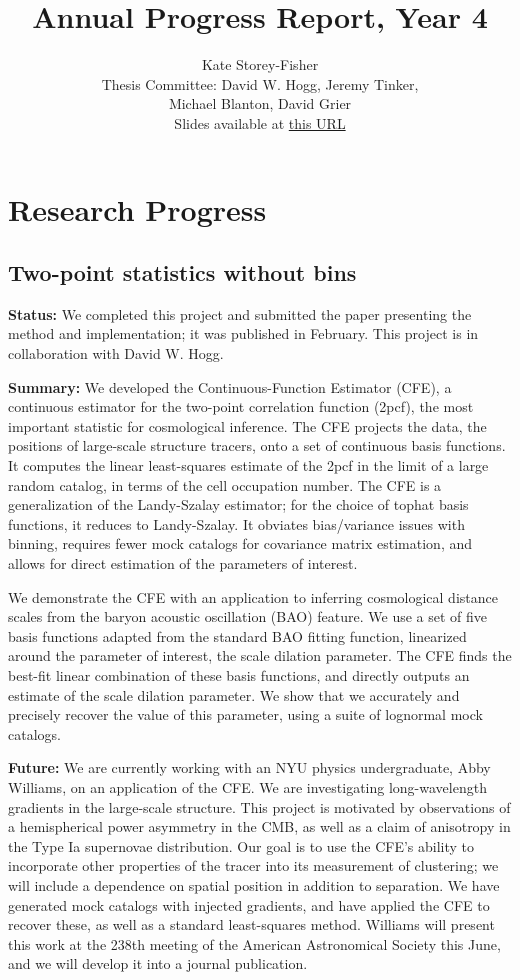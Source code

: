 \documentclass{article}
\title{Annual Progress Report, Year 4}
\author{Kate Storey-Fisher \\
Thesis Committee: David W. Hogg, Jeremy Tinker, \\
Michael Blanton, David Grier \\
Slides available at \href{https://docs.google.com/presentation/d/1hqaPXNtvDq3Bnf1CegbAA840C_V2PaNjywn1dg2yrPM/edit?usp=sharing}{this URL}
}
\begin{document}
\maketitle


\section{Research Progress}

\subsection{Two-point statistics without bins}

\hspace{\parindent} \textbf{Status:}
We completed this project and submitted the paper presenting the method and implementation; it was published in February.
This project is in collaboration with David W. Hogg.

\textbf{Summary:}
We developed the Continuous-Function Estimator (CFE), a continuous estimator for the two-point correlation function (2pcf), the most important statistic for cosmological inference.
The CFE projects the data, the positions of large-scale structure tracers, onto a set of continuous basis functions.
It computes the linear least-squares estimate of the 2pcf in the limit of a large random catalog, in terms of the cell occupation number.
The CFE is a generalization of the Landy-Szalay estimator; for the choice of tophat basis functions, it reduces to Landy-Szalay.
It obviates bias/variance issues with binning, requires fewer mock catalogs for covariance matrix estimation, and allows for direct estimation of the parameters of interest.

We demonstrate the CFE with an application to inferring cosmological distance scales from the baryon acoustic oscillation (BAO) feature.
We use a set of five basis functions adapted from the standard BAO fitting function, linearized around the parameter of interest, the scale dilation parameter.
The CFE finds the best-fit linear combination of these basis functions, and directly outputs an estimate of the scale dilation parameter.
We show that we accurately and precisely recover the value of this parameter, using a suite of lognormal mock catalogs.

\textbf{Future:}
We are currently working with an NYU physics undergraduate, Abby Williams, on an application of the CFE.
We are investigating long-wavelength gradients in the large-scale structure.
This project is motivated by observations of a hemispherical power asymmetry in the CMB, as well as a claim of anisotropy in the Type Ia supernovae distribution.
Our goal is to use the CFE's ability to incorporate other properties of the tracer into its measurement of clustering; we will include a dependence on spatial position in addition to separation.
We have generated mock catalogs with injected gradients, and have applied the CFE to recover these, as well as a standard least-squares method.
Williams will present this work at the 238th meeting of the American Astronomical Society this June, and we will develop it into a journal publication.
\end{document}
